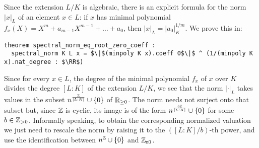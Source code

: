 \documentclass[sigplan,10pt, nonacm, review]{acmart}
\begin{document}
Since the extension $L/K$ is algebraic, there is an explicit formula for the norm $\lvert x\rvert_L$ of an element $x \in L$: if $x$ has minimal polynomial $f_x(X) = X^m + a_{m-1}X^{m-1} + \dots + a_0$, then $\lvert x\rvert _L = \lvert a_0\rvert _K^{1/m}$. We prove this in\href{https://github.com/LCFT-Lean/local_fields/blob/76ad487d09babdb0018f394a5634526637ee014a/src/spectral_norm.lean#L166}{\extlink}:

\begin{lstlisting}
theorem spectral_norm_eq_root_zero_coeff :
  spectral_norm K L x = $\|$(minpoly K x).coeff 0$\|$ ^ (1/(minpoly K x).nat_degree : $\RR$)
\end{lstlisting}

Since for every $x \in L$, the degree of the minimal polynomial $f_x$ of $x$ over $K$ divides the degree $[L : K]$ of the extension $L/K$\href{https://github.com/LCFT-Lean/local_fields/blob/76ad487d09babdb0018f394a5634526637ee014a/src/for_mathlib/field_theory/minpoly/is_integrally_closed.lean#L26}{\extlink}, we see that the norm $\lvert\cdot\rvert_L$ takes values in the subset $n^{\frac{\mathbb{Z}}{[L : K]}} \cup \{0\}$ of $\mathbb{R}_{\ge 0}$. The norm needs not surject onto that subset but, since $\mathbb{Z}$ is cyclic, its image is of the form $n^{\frac{b\mathbb{Z}}{[L : K]}} \cup \{0\}$ for some $b \in \mathbb{Z}_{>0}$. Informally speaking, to obtain the corresponding normalized valuation we just need to rescale the norm by raising it to the $([L:K]/b)$-th power, and use the identification between $n^{\mathbb{Z}} \cup \{0\}$ and $\mathbb{Z}_{\mathtt{m}0}$.
\end{document}
